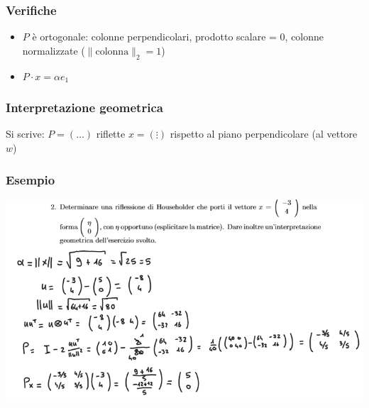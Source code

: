 \documentclass[10pt]{article}
\begin{document}
\subsubsection{Verifiche}
\begin{itemize}
    \item $P$ è ortogonale: colonne perpendicolari, prodotto scalare = 0, colonne normalizzate ($\lVert\text{colonna}\rVert_{2}=1$)
    \item $P\cdot x = \alpha e_{1}$
\end{itemize}
\subsubsection{Interpretazione geometrica}
Si scrive: $P=(\ldots)$ riflette $x=\left(\vdots\right)$ rispetto al piano perpendicolare (al vettore $w$)
\subsubsection*{Esempio}
\begin{center}
    \includegraphics[scale=0.5]{householder.png}
\end{center}
\end{document}
